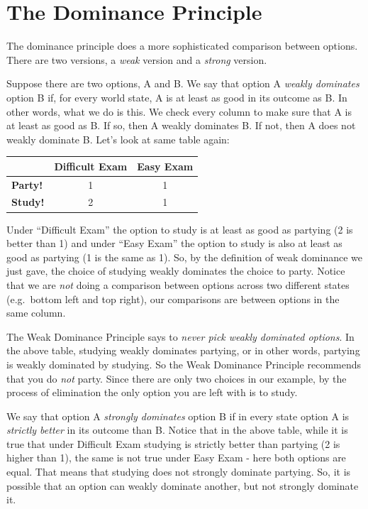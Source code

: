 \documentclass[]{tufte-book}
\begin{document}
\hypertarget{the-dominance-principle}{%
\section{The Dominance Principle}\label{the-dominance-principle}}

The dominance principle does a more sophisticated comparison between options. There are two versions, a \emph{weak} version and a \emph{strong} version.

Suppose there are two options, A and B. We say that option A \emph{weakly dominates} option B if, for every world state, A is at least as good in its outcome as B. In other words, what we do is this. We check every column to make sure that A is at least as good as B. If so, then A weakly dominates B. If not, then A does not weakly dominate B. Let's look at same table again:

\begin{longtable}[]{@{}lcc@{}}
\toprule
& Difficult Exam & Easy Exam\tabularnewline
\midrule
\endhead
\textbf{Party!} & 1 & 1\tabularnewline
\textbf{Study!} & 2 & 1\tabularnewline
\bottomrule
\end{longtable}

Under ``Difficult Exam'' the option to study is at least as good as partying (2 is better than 1) and under ``Easy Exam'' the option to study is also at least as good as partying (1 is the same as 1). So, by the definition of weak dominance we just gave, the choice of studying weakly dominates the choice to party. Notice that we are \emph{not} doing a comparison between options across two different states (e.g.~bottom left and top right), our comparisons are between options in the same column.

The Weak Dominance Principle says to \emph{never pick weakly dominated options}. In the above table, studying weakly dominates partying, or in other words, partying is weakly dominated by studying. So the Weak Dominance Principle recommends that you do \emph{not} party. Since there are only two choices in our example, by the process of elimination the only option you are left with is to study.

We say that option A \emph{strongly dominates} option B if in every state option A is \emph{strictly better} in its outcome than B. Notice that in the above table, while it is true that under Difficult Exam studying is strictly better than partying (2 is higher than 1), the same is not true under Easy Exam - here both options are equal. That means that studying does not strongly dominate partying. So, it is possible that an option can weakly dominate another, but not strongly dominate it.
\end{document}
